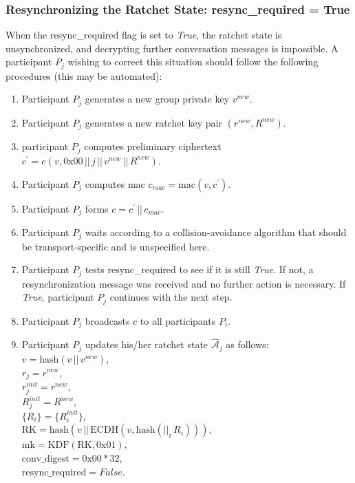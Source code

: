 \documentclass[%
preprint,
amsmath,amssymb,
aps,
prb,
floatfix,
]{revtex4-1}
\begin{document}
\subsubsection{\label{sec:sendresync}Resynchronizing the Ratchet State:
resync\_required = True}
When the resync\_required flag is set to \textit{True}, the ratchet state is
unsynchronized, and decrypting further conversation messages is impossible.
A participant $P_j$ wishing to correct this situation should follow the following
procedures (this may be automated):
\begin{enumerate}
\item Participant $P_j$ generates a new group private key $v^{new}$.
\item Participant $P_j$ generates a new ratchet key  pair $(r^{new}, R^{new})$.
\item participant $P_j$ computes preliminary ciphertext $c^\prime = e(v, 0\mathrm{x}00
\, || \, j \, || \, v^{new} \, || \, R^{new})$.
\item Participant $P_j$ computes mac $c_{mac} = \mathrm{mac}(v, c^\prime)$.
\item Participant $P_j$ forms $c = c^\prime \, || \, c_{mac}$.
\item Participant $P_j$ waits according to a collision-avoidance algorithm
that should be transport-specific and is unspecified here.
\item Participant $P_j$ tests resync\_required to see if it is still
\textit{True}. If not, a resynchronization message was received and no further
action is necessary. If \textit{True}, participant $P_j$ continues with the next
step.
\item Participant $P_j$ broadcasts $c$ to all participants $P_i$.
\item Participant $P_j$ updates his/her ratchet state
$\mathcal{\hat{A}}_j$ as follows:\\
$v = \mathrm{hash}(v \, || \, v^{new})$, \\
$r_j = r^{new}$, \\
$r_j^{init} = r^{new}$, \\
$R_j^{init} = R^{new}$, \\
$\{R_i\} = \{R_i^{init}\}$, \\
$\mathrm{RK} = \mathrm{hash}(v \, || \, \mathrm{ECDH}(v, \mathrm{hash}(||_i
\, R_i)))$, \\
$\mathrm{mk} = \mathrm{KDF}(\mathrm{RK}, 0\mathrm{x}01)$, \\
$\mathrm{conv\_digest} = 0\mathrm{x}00 * 32$, \\
$\mathrm{resync\_required} = False$.
\end{enumerate}
\end{document}
